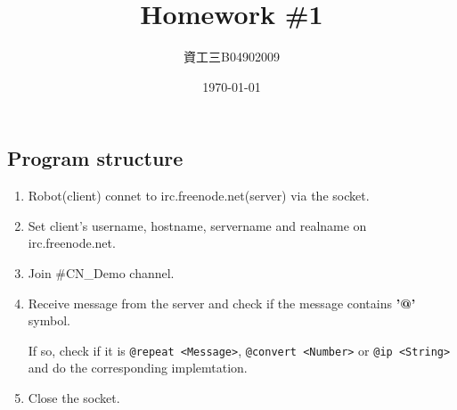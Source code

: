 \documentclass[12t, a4paper]{article}
\title{\vspace{-4ex}\bf{\LARGE{Homework \#1}}}
\author{資工三\space B04902009\space蕭千惠} %
\date{\vspace{-2ex}\today\vspace{-6ex}}
\begin{document}
	\begin{CJK}{UTF8}{bkai}
	\maketitle\thispagestyle{fancy}
	\fontsize{12pt}{16pt} \selectfont
	
	\section*{Program structure}
		\begin{enumerate}
		\item
			Robot(client) connet to irc.freenode.net(server) via the socket.
		\item
			Set client's username, hostname, servername and realname on irc.freenode.net.
		\item
			Join \#CN\_Demo channel.
		\item
			Receive message from the server and check if the message contains {\bf'@'} symbol. \par
			If so, check if it is \texttt{@repeat <Message>}, \texttt{@convert <Number>} or \texttt{@ip <String>} and do the corresponding implemtation.
		\item
			Close the socket.
		\end{enumerate}


\end{CJK}
\end{document}
